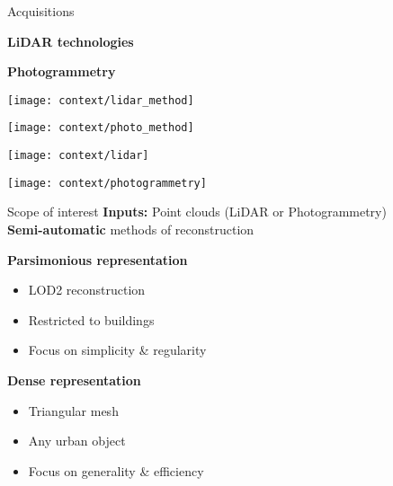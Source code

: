 \begin{frame}{Acquisitions}
	\small
	\centering
	\begin{minipage}{0.5\linewidth}
		\centering
		\textbf{LiDAR technologies}
	\end{minipage}%
	\begin{minipage}{0.5\linewidth}
		\centering
		\textbf{Photogrammetry}
	\end{minipage}

	\begin{minipage}{0.5\linewidth}
		\centering
		\texttt{[image: context/lidar\_method]}			
	\end{minipage}%
	\begin{minipage}{0.5\linewidth}
		\centering
		\texttt{[image: context/photo\_method]}
	\end{minipage}

	\begin{minipage}{0.5\linewidth}
		\centering
		\texttt{[image: context/lidar]}	
	\end{minipage}%
	\begin{minipage}{0.5\linewidth}
		\centering
		\texttt{[image: context/photogrammetry]}	
	\end{minipage}%
	
\end{frame}

\begin{frame}{Scope of interest}
	\small
	\textbf{Inputs:} Point clouds (LiDAR or Photogrammetry) \\
	\textbf{Semi-automatic} methods of reconstruction \\
	\pause

	\vspace{0.5cm}
	\textbf{Parsimonious representation}
	\begin{itemize}
		\item LOD2 reconstruction
		\item Restricted to buildings
		\item Focus on simplicity \& regularity
	\end{itemize}

	\pause
	\textbf{Dense representation}
	\begin{itemize}
		\item Triangular mesh
		\item Any urban object
		\item Focus on generality \& efficiency
	\end{itemize}
\end{frame}